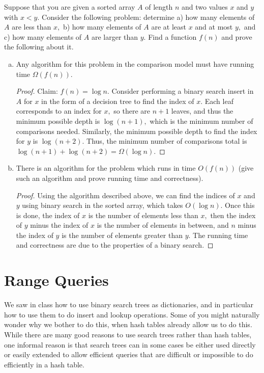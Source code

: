 \documentclass{article}
\begin{document}
Suppose that you are given a sorted array $A$ of length $n$ and two values $x$ and $y$ with $x<y.$ Consider the following problem: determine a) how many elements of $A$ are less than $x,$ b) how many elements of $A$ are at least $x$ and at most $y,$ and c) how many elements of $A$ are larger than $y.$ Find a function $f(n)$ and prove the following about it.
\begin{enumerate}[(a)]
	\item Any algorithm for this problem in the comparison model must have running time $\Omega(f(n)).$
		\begin{proof}
			Claim: $f(n)=\log n.$ Consider performing a binary search insert in $A$ for $x$ in the form of a decision tree to find the index of $x.$ Each leaf corresponds to an index for $x,$ so there are $n+1$ leaves, and thus the minimum possible depth is $\log(n+1),$ which is the minimum number of comparisons needed. Similarly, the minimum possible depth to find the index for $y$ is $\log(n+2).$ Thus, the minimum number of comparisons total is $\log(n+1) + \log(n+2) = \Omega(\log n).$
		\end{proof}

	\item There is an algorithm for the problem which runs in time $O(f(n))$ (give such an algorithm and prove running time and correctness).
		\begin{proof}
			Using the algorithm described above, we can find the indices of $x$ and $y$ using binary search in the sorted array, which takes $O(\log n).$ Once this is done, the index of $x$ is the number of elements less than $x,$ then the index of $y$ minus the index of $x$ is the number of elements in between, and $n$ minus the index of $y$ is the number of elements greater than $y.$ The running time and correctness are due to the properties of a binary search.
		\end{proof}

\end{enumerate}

\section{Range Queries}

We saw in class how to use binary search trees as dictionaries, and in particular how to use them to do insert and lookup operations. Some of you might naturally wonder why we bother to do this, when hash tables already allow us to do this. While there are many good reasons to use search trees rather than hash tables, one informal reason is that search trees can in some cases be either used directly or easily extended to allow efficient queries that are difficult or impossible to do efficiently in a hash table.
\end{document}
